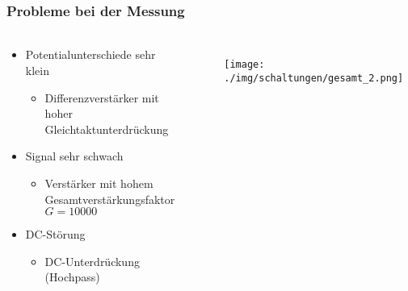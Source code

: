 \begin{frame}
    \frametitle{Probleme bei der Messung}
    \framesubtitle{}
    \begin{columns}[c]
    \begin{block}{}
        \begin{itemize}
            \item Potentialunterschiede sehr klein
            \begin{itemize}
                \item Differenzverstärker mit hoher
                Gleichtaktunterdrückung
            \end{itemize}
            \item Signal sehr schwach
            \begin{itemize}
                \item Verstärker mit hohem Gesamtverstärkungsfaktor $G=10000$
            \end{itemize}
            \item DC-Störung
            \pause
            \begin{itemize}
                \item DC-Unterdrückung (Hochpass)
            \end{itemize}
        \end{itemize}
    \end{block}
    \begin{figure}[H]
    \begin{center}
            \texttt{[image: ./img/schaltungen/gesamt\_2.png]}
    \end{center}
    \end{figure}
    \end{columns}
\end{frame}

